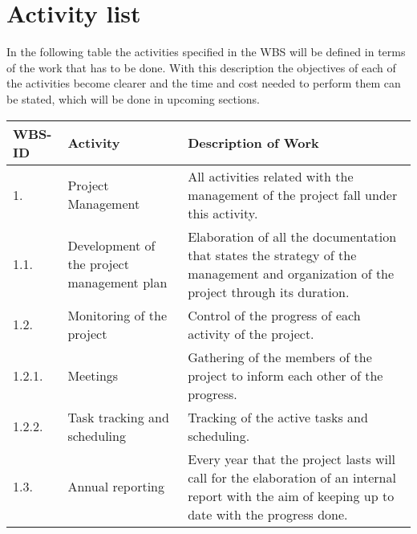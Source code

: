 \section{Activity list}
In the following table the activities specified in the WBS will be defined in terms of the work that has to be done. With this description the objectives of each of the activities become clearer and the time and cost needed to perform them can be stated, which will be done in upcoming sections.

\begin{longtable}[H]{p{1.5cm} >{\raggedright\arraybackslash}p{4cm} p{8cm}}
	
	\toprule[2pt]
	
	\textbf{WBS-ID} &  \textbf{Activity}  & \textbf{Description of Work} \\ 
	
	\midrule [1.5pt]
	\endhead
	
	1. & Project Management & All activities related with the management of the project fall under this activity.\vspace{0.2cm} \\
	
	\midrule
	
	1.1. & Development of the project management plan & Elaboration of all the documentation that states the strategy of the management and organization of the project through its duration.\vspace{0.2cm} \\
	
	\midrule
	
	1.2. & Monitoring of the project & Control of the progress of each activity of the project.\vspace{0.2cm} \\
	
	\midrule
	1.2.1. & Meetings & Gathering of the members of the project to inform each other of the progress.\vspace{0.2cm} \\
	
	\midrule
	
	1.2.2. & Task tracking and scheduling & Tracking of the active tasks and scheduling.\vspace{0.2cm} \\
	
	\midrule
	1.3. & Annual reporting & Every year that the project lasts will call for the elaboration of an internal report with the aim of keeping up to date with the progress done.\vspace{0.2cm} \\
	

\end{longtable}
